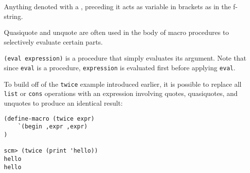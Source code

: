 Anything denoted with a , preceding it acts as variable in brackets as in the f-string.


Quasiquote and unquote are often used in the body of macro procedures to selectively evaluate certain parts. 

\texttt{(eval expression)} is a procedure that simply evaluates its argument. Note that since \texttt{eval} is a procedure, \texttt{expression} is evaluated first before applying \texttt{eval}.

To build off of the \texttt{twice} example introduced earlier, it is possible to replace all \texttt{list} or \texttt{cons} operations with an expression involving quotes, quasiquotes, and unquotes to produce an identical result:

\begin{lstlisting}
(define-macro (twice expr)
    `(begin ,expr ,expr)
)

scm> (twice (print 'hello))
hello
hello
\end{lstlisting}
